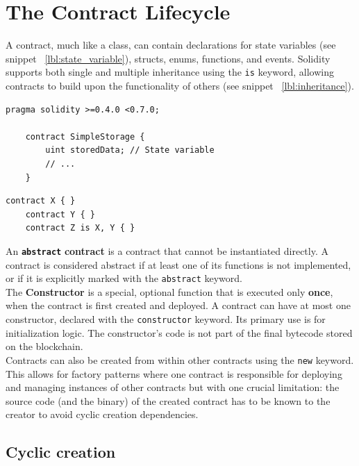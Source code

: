 \documentclass{scrbook}
\begin{document}
\section{The Contract Lifecycle}

A contract, much like a class, can contain declarations for state variables (see snippet ~\ref{lbl:state_variable}), structs, enums, functions, and events. Solidity supports both single and multiple inheritance using the \texttt{is} keyword, allowing contracts to build upon the functionality of others (see snippet ~\ref{lbl:inheritance}).

\begin{lstlisting}[caption={Example of contract with a declaration of a state variable - State variables are permanently stored in contract storage.}, label={lbl:state_variable}]
    pragma solidity >=0.4.0 <0.7.0;
    
    contract SimpleStorage {
        uint storedData; // State variable
        // ...
    }
\end{lstlisting}

\begin{lstlisting}[caption={Inheritance example}, label={lbl:inheritance}]
    contract X { }
    contract Y { }
    contract Z is X, Y { }
\end{lstlisting}

An \texttt{\textbf{abstract}} \textbf{contract} is a contract that cannot be instantiated directly. A contract is considered abstract if at least one of its functions is not implemented, or if it is explicitly marked with the \texttt{abstract} keyword.\\

The \textbf{Constructor} is a special, optional function that is executed only \textbf{once}, when the contract is first created and deployed. A contract can have at most one constructor, declared with the \texttt{constructor} keyword. Its primary use is for initialization logic. The constructor's code is not part of the final bytecode stored on the blockchain.\\

Contracts can also be created from within other contracts using the \texttt{new} keyword. This allows for factory patterns where one contract is responsible for deploying and managing instances of other contracts but with one crucial limitation: the source code (and the
binary) of the created contract has to be known to the creator to avoid cyclic creation dependencies.

\subsection{Cyclic creation}
\end{document}
